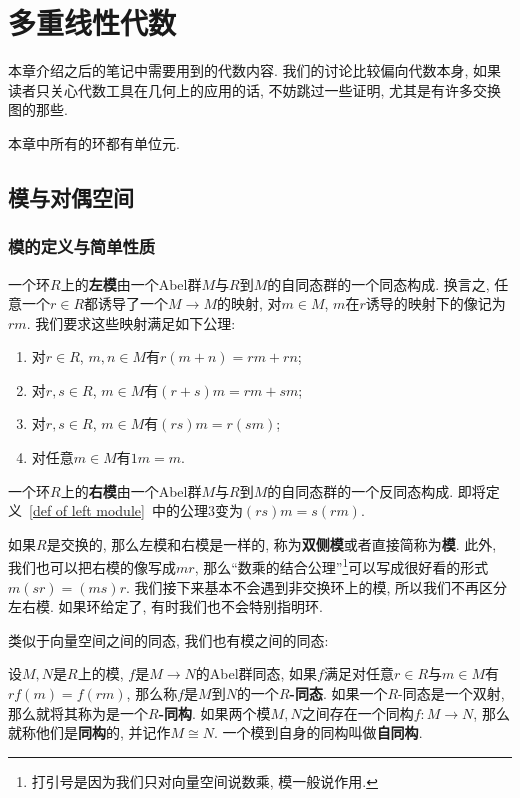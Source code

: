 \chapter{多重线性代数}
本章介绍之后的笔记中需要用到的代数内容.
我们的讨论比较偏向代数本身, 如果读者只关心代数工具在几何上的应用的话, 不妨跳过一些证明, 尤其是有许多交换图的那些.

本章中所有的环都有单位元.

\section{模与对偶空间}

\subsection*{模的定义与简单性质}

\begin{defn}\label{def of left module}
    一个环$R$上的\textbf{左模}由一个Abel群$M$与$R$到$M$的自同态群的一个同态构成.
    换言之, 任意一个$r\in R$都诱导了一个$M\to M$的映射, 对$m\in M$, $m$在$r$诱导的映射下的像记为$rm$.
    我们要求这些映射满足如下公理:
    \begin{enumerate}
        \item 对$r\in R$, $m,n\in M$有$r(m+n)=rm+rn$;
        \item 对$r,s\in R$, $m\in M$有$(r+s)m=rm+sm$;
        \item 对$r,s\in R$, $m\in M$有$(rs)m=r(sm)$;
        \item 对任意$m\in M$有$1m=m$.
    \end{enumerate}
\end{defn}

\begin{defn}
    一个环$R$上的\textbf{右模}由一个Abel群$M$与$R$到$M$的自同态群的一个反同态构成.
    即将定义~\ref{def of left module}~中的公理3变为$(rs)m=s(rm)$.
\end{defn}

\begin{rem}
    如果$R$是交换的, 那么左模和右模是一样的, 称为\textbf{双侧模}或者直接简称为\textbf{模}.
    此外, 我们也可以把右模的像写成$mr$, 那么``数乘的结合公理''\footnote{打引号是因为我们只对向量空间说数乘, 模一般说作用.}可以写成很好看的形式$m(sr)=(ms)r$.
    我们接下来基本不会遇到非交换环上的模, 所以我们不再区分左右模.
    如果环给定了, 有时我们也不会特别指明环.
\end{rem}

类似于向量空间之间的同态, 我们也有模之间的同态:
\begin{defn}
    设$M,N$是$R$上的模, $f$是$M\to N$的Abel群同态, 如果$f$满足对任意$r\in R$与$m\in M$有$rf(m)=f(rm)$, 那么称$f$是$M$到$N$的一个\textbf{$R$-同态}.
    如果一个$R$-同态是一个双射, 那么就将其称为是一个\textbf{$R$-同构}.
    如果两个模$M,N$之间存在一个同构$f:M\to N$, 那么就称他们是\textbf{同构}的, 并记作$M\cong N$.
    一个模到自身的同构叫做\textbf{自同构}.
\end{defn}

